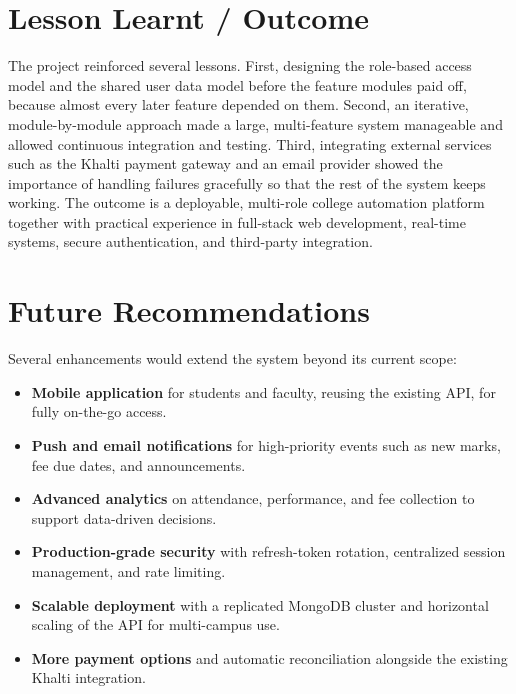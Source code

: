 \documentclass[12pt,a4paper]{report}
\begin{document}
\section{Lesson Learnt / Outcome}

The project reinforced several lessons. First, designing the role-based access model and the shared user data model before the feature modules paid off, because almost every later feature depended on them. Second, an iterative, module-by-module approach made a large, multi-feature system manageable and allowed continuous integration and testing. Third, integrating external services such as the Khalti payment gateway and an email provider showed the importance of handling failures gracefully so that the rest of the system keeps working. The outcome is a deployable, multi-role college automation platform together with practical experience in full-stack web development, real-time systems, secure authentication, and third-party integration.

\section{Future Recommendations}

Several enhancements would extend the system beyond its current scope:

\begin{itemize}
    \item \textbf{Mobile application} for students and faculty, reusing the existing API, for fully on-the-go access.
    \item \textbf{Push and email notifications} for high-priority events such as new marks, fee due dates, and announcements.
    \item \textbf{Advanced analytics} on attendance, performance, and fee collection to support data-driven decisions.
    \item \textbf{Production-grade security} with refresh-token rotation, centralized session management, and rate limiting.
    \item \textbf{Scalable deployment} with a replicated MongoDB cluster and horizontal scaling of the API for multi-campus use.
    \item \textbf{More payment options} and automatic reconciliation alongside the existing Khalti integration.
\end{itemize}

\clearpage
\end{document}
